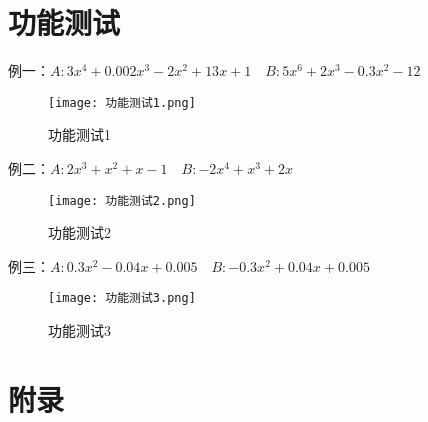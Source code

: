 \documentclass{DateStructure}
\begin{document}
\section{功能测试}
例一：$A:3x^{4}+0.002x^{3}-2x^{2}+13x+1\quad B:5x^{6}+2x^{3}-0.3x^{2}-12$\par
\begin{figure}[H]
\centering
\texttt{[image: 功能测试1.png]}
\caption{功能测试1}
\end{figure}
例二：$A:2x^{3}+x^{2}+x-1\quad B:-2x^{4}+x^{3}+2x$\par
\begin{figure}[H]
\centering
\texttt{[image: 功能测试2.png]}
\caption{功能测试2}
\end{figure}
例三：$A:0.3x^{2}-0.04x+0.005\quad B:-0.3x^{2}+0.04x+0.005$\par
\begin{figure}[H]
\centering
\texttt{[image: 功能测试3.png]}
\caption{功能测试3}
\end{figure}

\newpage 
\section{附录}

\end{document}
